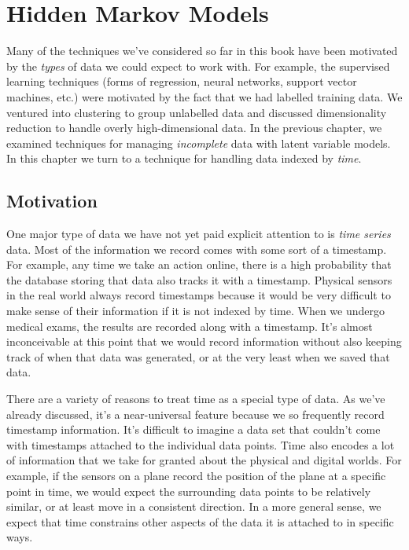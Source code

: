 \chapter{Hidden Markov Models}
Many of the techniques we've considered so far in this book have been motivated by the \textit{types} of data we could expect to work with. For example, the supervised learning techniques (forms of regression, neural networks, support vector machines, etc.) were motivated by the fact that we had labelled training data. We ventured into clustering to group unlabelled data and discussed dimensionality reduction to handle overly high-dimensional data. In the previous chapter, we examined techniques for managing \textit{incomplete} data with latent variable models. In this chapter we turn to a technique for handling data indexed by \textit{time}.

\section{Motivation}
One major type of data we have not yet paid explicit attention to is \textit{time series} data. Most of the information we record comes with some sort of a timestamp. For example, any time we take an action online, there is a high probability that the database storing that data also tracks it with a timestamp. Physical sensors in the real world always record timestamps because it would be very difficult to make sense of their information if it is not indexed by time. When we undergo medical exams, the results are recorded along with a timestamp. It's almost inconceivable at this point that we would record information without also keeping track of when that data was generated, or at the very least when we saved that data.

There are a variety of reasons to treat time as a special type of data. As we've already discussed, it's a near-universal feature because we so frequently record timestamp information. It's difficult to imagine a data set that couldn't come with timestamps attached to the individual data points. Time also encodes a lot of information that we take for granted about the physical and digital worlds. For example, if the sensors on a plane record the position of the plane at a specific point in time, we would expect the surrounding data points to be relatively similar, or at least move in a consistent direction. In a more general sense, we expect that time constrains other aspects of the data it is attached to in specific ways.

